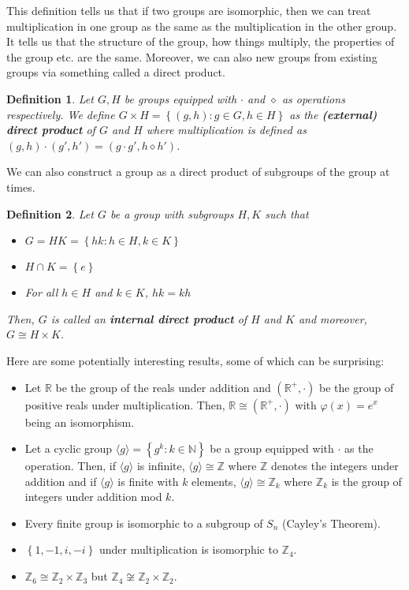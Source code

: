 \documentclass[letterpaper,12pt]{article}
\newcommand{\set}[1]{\left\{ #1 \right\}}
\newtheorem{definition}{Definition}[section]
\begin{document}
This definition tells us that if two groups are isomorphic, then we can treat multiplication in one group as the same as the multiplication in the other group. It tells us that the structure of the group, how things multiply, the properties of the group etc. are the same. Moreover, we can also new groups from existing groups via something called a direct product.
\begin{definition}
    Let $G,H$ be groups equipped with $\cdot$ and $\diamond$ as operations respectively. We define $G\times H = \set{(g,h) : g \in G, h \in H}$ as the \textbf{(external) direct product} of $G$ and $H$ where multiplication is defined as $(g,h) \cdot (g',h') = (g \cdot g',h \diamond h')$.
\end{definition}
We can also construct a group as a direct product of subgroups of the group at times. \begin{definition}
    Let $G$ be a group with subgroups $H,K$ such that \begin{itemize}
        \item $G=HK = \set{hk : h \in H, k \in K}$
        \item $H \cap K = \set{e}$
        \item For all $h \in H$ and $k \in K$, $hk=kh$
    \end{itemize}
    Then, $G$ is called an \textbf{internal direct product} of $H$ and $K$ and moreover, $G \cong H \times K$.
\end{definition}
Here are some potentially interesting results, some of which can be surprising: \begin{itemize}
\item Let $\mathbb{R}$ be the group of the reals under addition and $(\mathbb{R}^+,\cdot)$ be the group of positive reals under multiplication. Then, $\mathbb{R} \cong (\mathbb{R}^+,\cdot)$ with $\varphi(x) = e^x$ being an isomorphism.
    \item Let a cyclic group $\langle g \rangle = \set{g^k : k \in \mathbb{N}}$ be a group equipped with $\cdot$ as the operation. Then, if $\langle g \rangle$ is infinite, $\langle g \rangle \cong \mathbb{Z}$ where $\mathbb{Z}$ denotes the integers under addition and if $\langle g \rangle$ is finite with $k$ elements, $\langle g \rangle \cong \mathbb{Z}_k$ where $\mathbb{Z}_k$ is the group of integers under addition mod $k$.
    \item Every finite group is isomorphic to a subgroup of $S_n$ (Cayley's Theorem).
    \item $\set{1,-1,i,-i}$ under multiplication is isomorphic to $\mathbb{Z}_4$.
    \item $\mathbb{Z}_6 \cong \mathbb{Z}_2 \times \mathbb{Z}_3$ but $\mathbb{Z}_4 \not \cong \mathbb{Z}_2 \times \mathbb{Z}_2$.
\end{itemize} 
\end{document}

